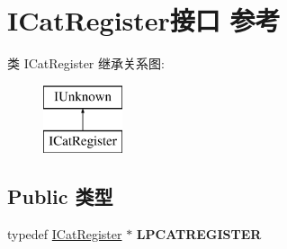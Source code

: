 \hypertarget{interface_i_cat_register}{}\section{I\+Cat\+Register接口 参考}
\label{interface_i_cat_register}
类 I\+Cat\+Register 继承关系图\+:\begin{figure}[H]
\begin{center}
\leavevmode
\includegraphics[height=2.000000cm]{interface_i_cat_register}
\end{center}
\end{figure}
\subsection*{Public 类型}
\begin{DoxyCompactItemize}
\item 
\mbox{\label{interface_i_cat_register_a066bf40086a6d9c36c7215c51800c616}} 
typedef \hyperlink{interface_i_cat_register}{I\+Cat\+Register} $\ast$ {\bfseries L\+P\+C\+A\+T\+R\+E\+G\+I\+S\+T\+ER}
\end{DoxyCompactItemize}
